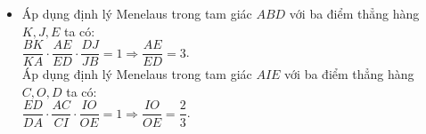 \begin{bt}
{\begin{enumerate}
\begin{itemize}
				Áp dụng định lý Menelaus trong tam giác $DBC$ với ba điểm thẳng hàng $J, O, F$ ta có$\colon$\\
				$\dfrac{DJ}{JB}\cdot \dfrac{BF}{FC}\cdot \dfrac{CO}{OD}= 1 \Rightarrow \dfrac{CO}{OD}=\dfrac{3}{2}$.\\
				Vậy $\dfrac{OC}{OD}=\dfrac{3}{2}$.
				\item 	Áp dụng định lý Menelaus trong tam giác $ABD$ với ba điểm thẳng hàng $K, J, E$ ta có$\colon$\\
				$\dfrac{BK}{KA}\cdot \dfrac{AE}{ED}\cdot \dfrac{DJ}{JB}= 1 \Rightarrow \dfrac{AE}{ED}=3$.\\
				Áp dụng định lý Menelaus trong tam giác $AIE$ với ba điểm thẳng hàng $C, O, D$ ta có$\colon$\\
				$\dfrac{ED}{DA}\cdot \dfrac{AC}{CI} \cdot \dfrac{IO}{OE}= 1 \Rightarrow \dfrac{IO}{OE}=\dfrac{2}{3}$.\\
				
			\end{itemize}	
		\end{enumerate}
	}
\end{bt}
